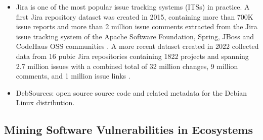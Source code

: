 \begin{itemize}
    \item Jira is one of the most popular issue tracking systems (ITSs) in practice. A first Jira repository dataset was created in 2015, containing more than 700K issue reports and more than 2 million issue comments extracted from the Jira issue tracking system of the Apache Software Foundation, Spring, JBoss and CodeHaus OSS communities \cite{Ortu2015}.
    A more recent dataset created in 2022 collected data from 16 pubic Jira repositories containing 1822 projects and spanning 2.7 million issues with a combined total of 32 million changes, 9 million comments, and 1 million issue links \cite{Montgomery2022Jira,montgomery2022alternative}.
  
    \item DebSources: open source source code and related metadata for the Debian Linux distribution.  \cite{debsources-ese-2016}

          
\end{itemize}


\subsection{Mining Software Vulnerabilities in Ecosystems}


